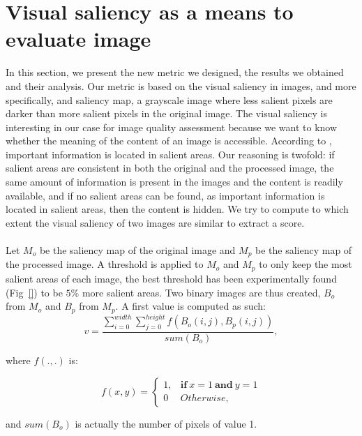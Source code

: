 \documentclass{article}
\begin{document}
\section{Visual saliency as a means to evaluate image}
\label{sec:metric}
In this section, we present the new metric we designed, the results we obtained and their analysis. Our metric is based on the visual saliency in images, and more specifically, and saliency map, a grayscale image where less salient pixels are darker than more salient pixels in the original image. The visual saliency is interesting in our case for image quality assessment because we want to know whether the meaning of the content of an image is accessible. According to \cite{itti1998model}, important information is located in salient areas. Our reasoning is twofold: if salient areas are consistent in both the original and the processed image, the same amount of information is present in the images and the content is readily available, and if no salient areas can be found, as important information is located in salient areas, then the content is hidden. We try to compute to which extent the visual saliency of two images are similar to extract a score.

\paragraph*{}
Let $M_o$  be the saliency map of the original image and $M_p$ be the saliency map of the processed image. A threshold is applied to $M_o$ and $M_p$ to only keep the most salient areas of each image, the best threshold has been experimentally found (Fig~\ref{}) to be $5\%$ more salient areas. Two binary images are thus created, $B_o$ from $M_o$ and $B_p$ from $M_p$. A first value is computed as such:
$$
v = \frac{\sum_{i=0}^{width}\sum_{j=0}^{height}{f(B_o(i,j), B_p(i,j))}}{sum(B_o)},
$$

where $f(.,.)$ is:

$$
f(x,y) = \begin{cases}
    1, & \textbf{if}\ x = 1\ \textbf{and}\ y = 1\\ 
    0 & Otherwise,
  \end{cases}
$$

and $sum(B_o)$ is actually the number of pixels of value 1.
\end{document}
